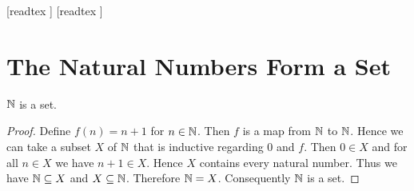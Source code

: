 \documentclass[10pt]{article}
\begin{document}
  \begin{imports}
    \begin{forthel}
      [readtex ]
      [readtex ]
    \end{forthel}
  \end{imports}


  \section*{The Natural Numbers Form a Set}

  \begin{forthel}
    \begin{proposition}[id=ARITHMETIC_07_4685510236547454,printid]
      $\mathbb{N}$ is a set.
    \end{proposition}
    \begin{proof}
      Define $f(n) = n + 1$ for $n \in \mathbb{N}$.
      Then $f$ is a map from $\mathbb{N}$ to $\mathbb{N}$.
      Hence we can take a subset $X$ of $\mathbb{N}$ that is inductive regarding
      $0$ and $f$.
      Then $0 \in X$ and for all $n \in X$ we have $n + 1 \in X$.
      Hence $X$ contains every natural number.
      Thus we have $\mathbb{N} \subseteq X$ and $X \subseteq \mathbb{N}$.
      Therefore $\mathbb{N} = X$.
      Consequently $\mathbb{N}$ is a set.
    \end{proof}
  \end{forthel}
\end{document}
